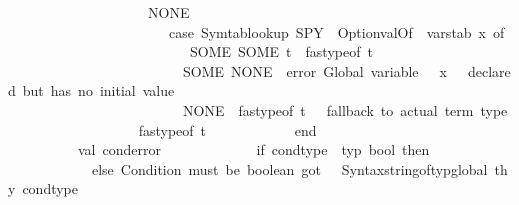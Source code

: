 \begin{isabellebody}
\ \ \ \ \ \ \ \ \ \ \ \ \ \ \ \ \ \ \ {\isacharbar}{\kern0pt}\ NONE\ {\isacharequal}{\kern0pt}{\isachargreater}{\kern0pt}\isanewline
\ \ \ \ \ \ \ \ \ \ \ \ \ \ \ \ \ \ \ \ \ \ \ {\isacharparenleft}{\kern0pt}case\ Symtab{\isachardot}{\kern0pt}lookup\ {\isacharparenleft}{\kern0pt}{\isacharbang}{\kern0pt}SPY\ {\isacharbar}{\kern0pt}{\isachargreater}{\kern0pt}\ Option{\isachardot}{\kern0pt}valOf\ {\isacharbar}{\kern0pt}{\isachargreater}{\kern0pt}\ {\isacharhash}{\kern0pt}varstab{\isacharparenright}{\kern0pt}\ x\ of\isanewline
\ \ \ \ \ \ \ \ \ \ \ \ \ \ \ \ \ \ \ \ \ \ \ \ \ \ SOME\ {\isacharparenleft}{\kern0pt}SOME\ t{\isacharprime}{\kern0pt}{\isacharparenright}{\kern0pt}\ {\isacharequal}{\kern0pt}{\isachargreater}{\kern0pt}\ fastype{\isacharunderscore}{\kern0pt}of\ t{\isacharprime}{\kern0pt}\isanewline
\ \ \ \ \ \ \ \ \ \ \ \ \ \ \ \ \ \ \ \ \ \ \ \ {\isacharbar}{\kern0pt}\ SOME\ NONE\ {\isacharequal}{\kern0pt}{\isachargreater}{\kern0pt}\ error\ {\isacharparenleft}{\kern0pt}{\isachardoublequote}{\kern0pt}Global\ variable\ {\isachardoublequote}{\kern0pt}\ {\isacharcircum}{\kern0pt}\ x\ {\isacharcircum}{\kern0pt}\ {\isachardoublequote}{\kern0pt}\ declared\ but\ has\ no\ initial\ value{\isachardoublequote}{\kern0pt}{\isacharparenright}{\kern0pt}\isanewline
\ \ \ \ \ \ \ \ \ \ \ \ \ \ \ \ \ \ \ \ \ \ \ \ {\isacharbar}{\kern0pt}\ NONE\ {\isacharequal}{\kern0pt}{\isachargreater}{\kern0pt}\ fastype{\isacharunderscore}{\kern0pt}of\ t{\isacharparenright}{\kern0pt}{\isacharparenright}{\kern0pt}\ \ {\isacharparenleft}{\kern0pt}{\isacharasterisk}{\kern0pt}\ fallback\ to\ actual\ term\ type\ {\isacharasterisk}{\kern0pt}{\isacharparenright}{\kern0pt}\isanewline
\ \ \ \ \ \ \ \ \ \ \ \ \ \ {\isacharbar}{\kern0pt}\ {\isacharunderscore}{\kern0pt}\ {\isacharequal}{\kern0pt}{\isachargreater}{\kern0pt}\ fastype{\isacharunderscore}{\kern0pt}of\ t\isanewline
\ \ \ \ \ \ \ \ \ \ \ \ end\isanewline
\ \ \ \ \isanewline
\ \ \ \ \ \ \ \ \ \ val\ cond{\isacharunderscore}{\kern0pt}error\ {\isacharequal}{\kern0pt}\isanewline
\ \ \ \ \ \ \ \ \ \ \ \ if\ cond{\isacharunderscore}{\kern0pt}type\ {\isacharequal}{\kern0pt}\ {\isacharat}{\kern0pt}{\isacharbraceleft}{\kern0pt}typ\ bool{\isacharbraceright}{\kern0pt}\ then\ {\isacharbrackleft}{\kern0pt}{\isacharbrackright}{\kern0pt}\isanewline
\ \ \ \ \ \ \ \ \ \ \ \ else\ {\isacharbrackleft}{\kern0pt}{\isachardoublequote}{\kern0pt}Condition\ must\ be\ boolean{\isacharcomma}{\kern0pt}\ got{\isacharcolon}{\kern0pt}\ {\isachardoublequote}{\kern0pt}\ {\isacharcircum}{\kern0pt}\ Syntax{\isachardot}{\kern0pt}string{\isacharunderscore}{\kern0pt}of{\isacharunderscore}{\kern0pt}typ{\isacharunderscore}{\kern0pt}global\ thy\ cond{\isacharunderscore}{\kern0pt}type{\isacharbrackright}{\kern0pt}\isanewline

\end{isabellebody}
